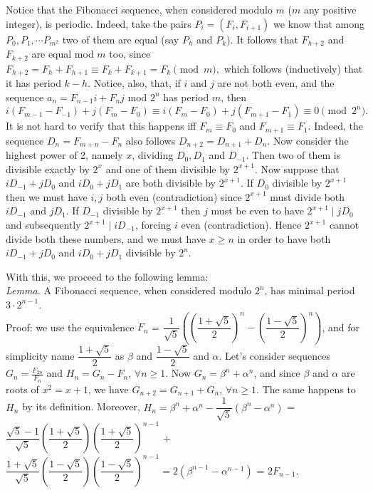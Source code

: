 \documentclass[11pt,a4paper]{article}
\begin{document}
Notice that the Fibonacci sequence, when considered modulo $m$ ($m$ any positive integer), is periodic. Indeed, take the pairs $P_{i}=(F_{i}, F_{i+1})$ we know that among $P_0, P_1,\cdots P_{m^2}$ two of them are equal (say $P_h$ and $P_k$). It follows that $F_{h+2}$ and $F_{k+2}$ are equal mod $m$ too, since $F_{h+2}=F_{h}+F_{h+1}\equiv F_{k}+F_{k+1}=F_{k}\pmod {m},$ which follows (inductively) that it has period $k-h$. Notice, also, that, if $i$ and $j$ are not both even, and the sequence $a_n=F_{n-1}i+F_nj$ mod $2^n$ has period $m$, then $i(F_{m-1}-F_{-1})+j(F_{m}-F_{0})\equiv i(F_{m}-F_{0})+j(F_{m+1}-F_{1})\equiv 0\pmod {2^{n}}.$ It is not hard to verify that this happens iff $F_m\equiv F_0$ and $F_{m+1}\equiv F_1$. Indeed, the sequence $D_n=F_{m+n}-F_n$ also follows $D_{n+2}=D_{n+1}+D_n$. Now consider the highest power of 2, namely $x$, dividing $D_0, D_1$ and $D_{-1}$. Then two of them is divisible exactly by $2^x$ and one of them divisible by $2^{x+1}$.  Now suppose that $iD_{-1}+jD_0$ and $iD_0+jD_1$ are both divisible by $2^{x+1}$. If $D_{0}$ divisible by $2^{x+1}$ then we must have $i, j$ both even (contradiction) since $2^{x+1}$ must divide both $iD_{-1}$ and $jD_{1}$. If $D_{-1}$ divisible by $2^{x+1}$ then $j$ must be even to have $2^{x+1}\mid jD_0$ and subsequently $2^{x+1}\mid iD_{-1}$, forcing $i$ even (contradiction). Hence $2^{x+1}$ cannot divide both these numbers, and we must have $x\ge n$ in order to have both  $iD_{-1}+jD_0$ and $iD_0+jD_1$ divisible by $2^n$.

With this, we proceed to the following lemma:\\
\emph {Lemma.} A Fibonacci sequence, when considered modulo $2^n$, has minimal period $3\cdot 2^{n-1}$.\\
Proof: we use the equivalence $F_n$ = $\dfrac{1}{\sqrt{5}}\left(\left(\dfrac{1+\sqrt{5}}{2}\right)^{n}-\left(\dfrac{1-\sqrt{5}}{2}\right)^{n}\right)$, and for simplicity name $\dfrac{1+\sqrt{5}}{2}$ as $\beta$ and $\dfrac{1-\sqrt{5}}{2}$ and $\alpha$. Let's consider sequences $G_{n}=\frac{F_{2n}}{F_n}$ and $H_{n}=G_n-F_n$, $\forall n\ge 1$. Now $G_n=\beta ^n+\alpha ^n$, and since $\beta$ and $\alpha$ are roots of $x^2=x+1$, we have $G_{n+2}=G_{n+1}+G_n$, $\forall n\ge 1$. The same happens to $H_n$ by its definition. Moreover, $H_n=\beta ^n+\alpha ^n-\dfrac{1}{\sqrt{5}}(\beta ^n-\alpha ^n)$ = $\dfrac{\sqrt{5}-1}{\sqrt{5}}\left(\dfrac{1+\sqrt{5}}{2}\right)\left(\dfrac{1+\sqrt{5}}{2}\right)^{n-1}$ + $\dfrac{1+\sqrt{5}}{\sqrt{5}}\left(\dfrac{1-\sqrt{5}}{2}\right)\left(\dfrac{1-\sqrt{5}}{2}\right)^{n-1}=2(\beta ^{n-1}-\alpha ^{n-1})$ = $2F_{n-1}.$
\end{document}
